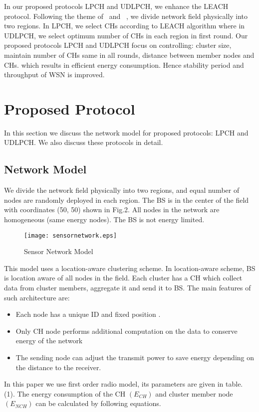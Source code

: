 \documentclass[journal]{IEEEtran}
\begin{document}
In our proposed protocols LPCH and UDLPCH, we enhance the LEACH protocol. Following the theme of~\cite{R19} and ~\cite{R20}, we divide network field physically into two regions. In LPCH, we select CHs according to LEACH algorithm where in UDLPCH, we select optimum number of CHs in each region in first round. Our proposed protocols LPCH and UDLPCH focus on controlling: cluster size, maintain number of CHs same in all rounds, distance between member nodes and CHs. which results in efficient energy consumption. Hence stability period and throughput of WSN is improved.

\section{Proposed Protocol}
In this section we discuss the network model for proposed protocols: LPCH and UDLPCH. We also discuss these protocols in detail.

\subsection{Network Model}
We divide the network field physically into two regions, and equal number of nodes are randomly deployed in each region. The BS is in the center of the field with coordinates (50, 50) shown in Fig.2. All nodes in the network are homogeneous (same energy nodes). The BS is not energy limited.
\begin{figure}[h]
\centering
\texttt{[image: sensornetwork.eps]}
\caption{Sensor Network Model}
\end{figure}
This model uses a location-aware clustering scheme. In location-aware scheme, BS is location aware of all nodes in the field. Each cluster has a CH which collect data from cluster members, aggregate it and send it to BS. The main features of such architecture are:
\begin{itemize}
\item
Each node has a unique ID and fixed position .
\item
Only CH node performs additional computation on the data to conserve energy of the network
\item
The sending node can adjust the transmit power to save energy depending on the distance to the receiver.
\end{itemize}
In this paper we use first order radio model, its parameters are given in table. (1). The energy consumption of the CH $(E_{CH})$ and cluster member node $(E_{NCH})$ can be calculated by following equations.
\end{document}

